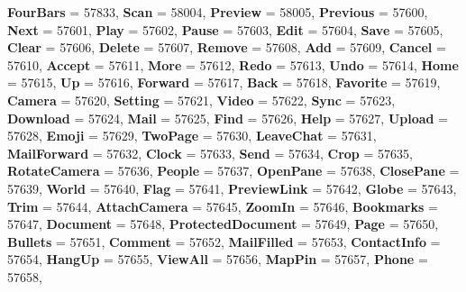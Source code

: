 \begin{DoxyCompactItemize}
{\bfseries Four\+Bars} = 57833, 
{\bfseries Scan} = 58004, 
\newline
{\bfseries Preview} = 58005, 
{\bfseries Previous} = 57600, 
{\bfseries Next} = 57601, 
{\bfseries Play} = 57602, 
\newline
{\bfseries Pause} = 57603, 
{\bfseries Edit} = 57604, 
{\bfseries Save} = 57605, 
{\bfseries Clear} = 57606, 
\newline
{\bfseries Delete} = 57607, 
{\bfseries Remove} = 57608, 
{\bfseries Add} = 57609, 
{\bfseries Cancel} = 57610, 
\newline
{\bfseries Accept} = 57611, 
{\bfseries More} = 57612, 
{\bfseries Redo} = 57613, 
{\bfseries Undo} = 57614, 
\newline
{\bfseries Home} = 57615, 
{\bfseries Up} = 57616, 
{\bfseries Forward} = 57617, 
{\bfseries Back} = 57618, 
\newline
{\bfseries Favorite} = 57619, 
{\bfseries Camera} = 57620, 
{\bfseries Setting} = 57621, 
{\bfseries Video} = 57622, 
\newline
{\bfseries Sync} = 57623, 
{\bfseries Download} = 57624, 
{\bfseries Mail} = 57625, 
{\bfseries Find} = 57626, 
\newline
{\bfseries Help} = 57627, 
{\bfseries Upload} = 57628, 
{\bfseries Emoji} = 57629, 
{\bfseries Two\+Page} = 57630, 
\newline
{\bfseries Leave\+Chat} = 57631, 
{\bfseries Mail\+Forward} = 57632, 
{\bfseries Clock} = 57633, 
{\bfseries Send} = 57634, 
\newline
{\bfseries Crop} = 57635, 
{\bfseries Rotate\+Camera} = 57636, 
{\bfseries People} = 57637, 
{\bfseries Open\+Pane} = 57638, 
\newline
{\bfseries Close\+Pane} = 57639, 
{\bfseries World} = 57640, 
{\bfseries Flag} = 57641, 
{\bfseries Preview\+Link} = 57642, 
\newline
{\bfseries Globe} = 57643, 
{\bfseries Trim} = 57644, 
{\bfseries Attach\+Camera} = 57645, 
{\bfseries Zoom\+In} = 57646, 
\newline
{\bfseries Bookmarks} = 57647, 
{\bfseries Document} = 57648, 
{\bfseries Protected\+Document} = 57649, 
{\bfseries Page} = 57650, 
\newline
{\bfseries Bullets} = 57651, 
{\bfseries Comment} = 57652, 
{\bfseries Mail\+Filled} = 57653, 
{\bfseries Contact\+Info} = 57654, 
\newline
{\bfseries Hang\+Up} = 57655, 
{\bfseries View\+All} = 57656, 
{\bfseries Map\+Pin} = 57657, 
{\bfseries Phone} = 57658, 
\newline

\end{DoxyCompactItemize}
